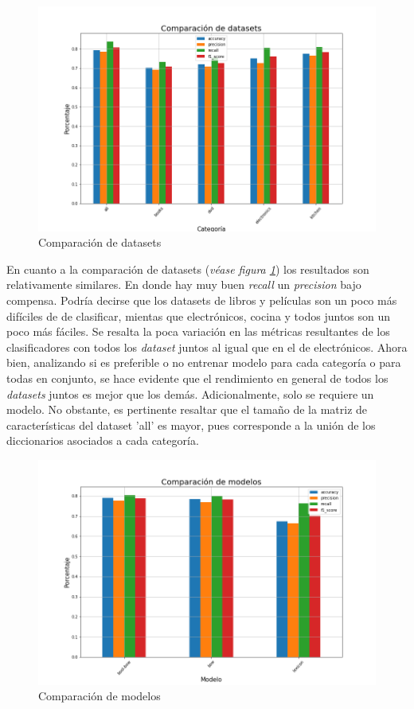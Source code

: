 \begin{figure}[H]
    \centering
    \includegraphics[scale = 0.45]{results/datasets_comparison.png}
    \caption{Comparación de datasets}
    \label{fig:dataset_comparison}
\end{figure}

En cuanto a la comparación de datasets (\textit{véase figura \ref{fig:dataset_comparison}}) los resultados son relativamente similares. En donde hay muy buen \textit{recall} un \textit{precision} bajo compensa. Podría decirse que los datasets de libros y películas son un poco más difíciles de de clasificar, mientas que electrónicos, cocina y todos juntos son un poco más fáciles. Se resalta la poca variación en las métricas resultantes de los clasificadores con todos los \textit{dataset} juntos al igual que en el de electrónicos. Ahora bien, analizando si es preferible o no entrenar modelo para cada categoría o para todas en conjunto, se hace evidente que el rendimiento en general de todos los \textit{datasets} juntos es mejor que los demás. Adicionalmente, solo se requiere un modelo. No obstante, es pertinente resaltar que el tamaño de la matriz de características del dataset 'all' es mayor, pues corresponde a la unión de los diccionarios asociados a cada categoría.

\begin{figure}[H]
    \centering
    \includegraphics[scale = 0.45]{results/model_comparison.png}
    \caption{Comparación de modelos}
    \label{fig:model_comparisson}
\end{figure}

